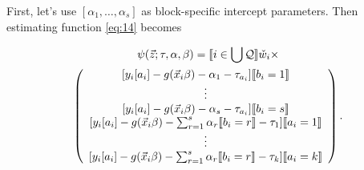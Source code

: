 \documentclass{article}
\DeclarePairedDelimiter{\indicator}{\llbracket}{\rrbracket}
\newcommand{\owt}[1][{[a_i]}]{\ensuremath{\check{w}_{i#1}}}
\begin{document}
First, let's use $[\alpha_{1}, \ldots, \alpha_{s}]$
as block-specific intercept parameters. Then 
estimating function \eqref{eq:14} becomes

\begin{multline}
  \label{eq:9}
  \psi(\vec{z}; \tau, \alpha, \beta) =
  \indicator{i \in \bigcup \mathcal{Q}} \owt[]\times \\  
  \left(
    \begin{array}{c}
           [y_{i}[a_{i}] - g(\vec{x}_{i}\beta)-
                  \alpha_{1} -
      \tau_{a_{i}}]\indicator{b_{i}=1}\\
      \vdots\\ 
          {} [y_{i}[a_{i}] - g(\vec{x}_{i}\beta)-
                  \alpha_{s} -
      \tau_{a_{i}}]\indicator{b_{i}=s}\\      
         {}  [y_{i}[a_{i}] - g(\vec{x}_{i}\beta)-
                  \sum_{r=1}^s\alpha_r\indicator{b_i=r}-\tau_{1}]\indicator{a_{i}=1}\\
                  \vdots \\
          {} [y_{i}[a_{i}] - g(\vec{x}_{i}\beta)-
                 \sum_{r=1}^s\alpha_r\indicator{b_i=r} - \tau_{k}]\indicator{a_{i}=k}\\
    \end{array}
\right).
\end{multline}
\end{document}
